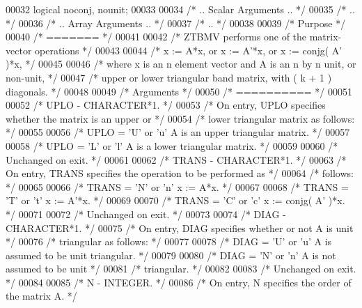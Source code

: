 \begin{DoxyCode}
00032     logical noconj, nounit;
00033 
00034 \textcolor{comment}{/*     .. Scalar Arguments .. */}
00035 \textcolor{comment}{/*     .. */}
00036 \textcolor{comment}{/*     .. Array Arguments .. */}
00037 \textcolor{comment}{/*     .. */}
00038 
00039 \textcolor{comment}{/*  Purpose */}
00040 \textcolor{comment}{/*  ======= */}
00041 
00042 \textcolor{comment}{/*  ZTBMV  performs one of the matrix-vector operations */}
00043 
00044 \textcolor{comment}{/*     x := A*x,   or   x := A'*x,   or   x := conjg( A' )*x, */}
00045 
00046 \textcolor{comment}{/*  where x is an n element vector and  A is an n by n unit, or non-unit, */}
00047 \textcolor{comment}{/*  upper or lower triangular band matrix, with ( k + 1 ) diagonals. */}
00048 
00049 \textcolor{comment}{/*  Arguments */}
00050 \textcolor{comment}{/*  ========== */}
00051 
00052 \textcolor{comment}{/*  UPLO   - CHARACTER*1. */}
00053 \textcolor{comment}{/*           On entry, UPLO specifies whether the matrix is an upper or */}
00054 \textcolor{comment}{/*           lower triangular matrix as follows: */}
00055 
00056 \textcolor{comment}{/*              UPLO = 'U' or 'u'   A is an upper triangular matrix. */}
00057 
00058 \textcolor{comment}{/*              UPLO = 'L' or 'l'   A is a lower triangular matrix. */}
00059 
00060 \textcolor{comment}{/*           Unchanged on exit. */}
00061 
00062 \textcolor{comment}{/*  TRANS  - CHARACTER*1. */}
00063 \textcolor{comment}{/*           On entry, TRANS specifies the operation to be performed as */}
00064 \textcolor{comment}{/*           follows: */}
00065 
00066 \textcolor{comment}{/*              TRANS = 'N' or 'n'   x := A*x. */}
00067 
00068 \textcolor{comment}{/*              TRANS = 'T' or 't'   x := A'*x. */}
00069 
00070 \textcolor{comment}{/*              TRANS = 'C' or 'c'   x := conjg( A' )*x. */}
00071 
00072 \textcolor{comment}{/*           Unchanged on exit. */}
00073 
00074 \textcolor{comment}{/*  DIAG   - CHARACTER*1. */}
00075 \textcolor{comment}{/*           On entry, DIAG specifies whether or not A is unit */}
00076 \textcolor{comment}{/*           triangular as follows: */}
00077 
00078 \textcolor{comment}{/*              DIAG = 'U' or 'u'   A is assumed to be unit triangular. */}
00079 
00080 \textcolor{comment}{/*              DIAG = 'N' or 'n'   A is not assumed to be unit */}
00081 \textcolor{comment}{/*                                  triangular. */}
00082 
00083 \textcolor{comment}{/*           Unchanged on exit. */}
00084 
00085 \textcolor{comment}{/*  N      - INTEGER. */}
00086 \textcolor{comment}{/*           On entry, N specifies the order of the matrix A. */}

\end{DoxyCode}
